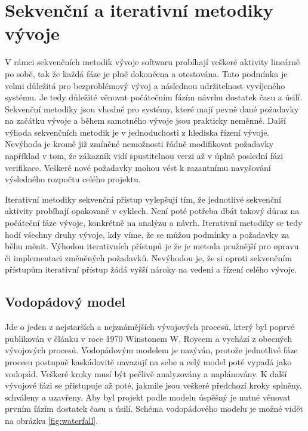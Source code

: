 \documentclass[czech,master]{diploma}
\begin{document}
\section{Sekvenční a iterativní metodiky vývoje}
V rámci sekvenčních metodik vývoje softwaru probíhají veškeré aktivity lineárně po sobě, tak že každá fáze je plně dokončena a otestována. Tato podmínka je velmi důležitá pro bezproblémový vývoj a následnou udržitelnost vyvíjeného systému. Je tedy důležité věnovat počátečním fázím návrhu dostatek času a úsilí. Sekvenční metodiky jsou vhodné pro systémy, které mají pevně dané požadavky na začátku vývoje a během samotného vývoje jsou prakticky neměnné. Další výhoda sekvenčních metodik je  v jednoduchosti z hlediska řízení vývoje. Nevýhoda je kromě již zmíněné nemožnosti řádně modifikovat požadavky například v tom, že zákazník vidí spustitelnou verzi až v úplně poslední fázi verifikace. Veškeré nové požadavky mohou vést k razantnímu navyšování výsledného rozpočtu celého projektu.

Iterativní metodiky sekvenční přístup vylepšují tím, že jednotlivé sekvenční aktivity probíhají opakovaně v cyklech. Není poté potřeba dbát takový důraz na počáteční fáze vývoje, konkrétně na analýzu a návrh. Iterativní metodiky se tedy hodí všechny druhy vývoje, kdy víme, že se můžou podmínky a požadavky za běhu měnit. Výhodou iterativních přístupů je že je metoda pružnější pro opravu či implementaci změněných požadavků. Nevýhodou je, že si oproti sekvenčním přístupům iterativní přístup žádá vyšší nároky na vedení a řízení celého vývoje.

\subsection{Vodopádový model}
Jde o jeden z nejstarších a nejznámějších vývojových procesů, který byl poprvé publikován v článku v roce 1970 Winstonem W. Roycem a vychází z obecných vývojových procesů. Vodopádovým modelem je nazýván, protože jednotlivé fáze procesu postupně kaskádovitě navazují na sebe a celý model poté vypadá jako vodopád. Veškeré kroky musí být pečlivě analyzovány a naplánovány. K další vývojové fázi se přistupuje až poté, jakmile jsou veškeré předchozí kroky splněny, schváleny a uzavřeny. \cite{ref:sommerrville_waterfall} Aby byl projekt podle modelu úspěšný je nutné věnovat prvním fázím dostatek času a úsilí. Schéma vodopádového modelu je možné vidět na obrázku \ref{fig:waterfall}.
\end{document}
